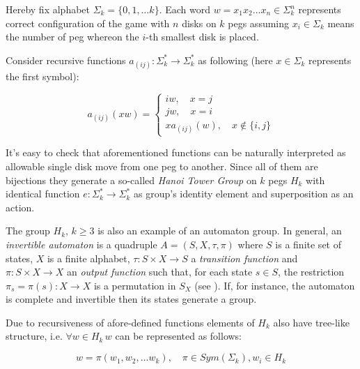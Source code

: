 \documentclass[a4paper,12pt]{amsart}
\begin{document}
Hereby fix alphabet $\Sigma_k = \{0, 1, \dots k\}$. Each word $w = x_1x_2\dots x_n \in \Sigma_k^n$ represents correct configuration of the game with $n$ disks on $k$ pegs assuming $x_i \in \Sigma_k$ means the number of peg whereon the $i$-th smallest disk is placed. 

Consider recursive functions $a_{(ij)} : \Sigma_k^* \rightarrow \Sigma_k^*$ as following (here $x \in \Sigma_k$ represents the first symbol): 

$$
a_{(ij)}(xw) = 
	\begin{cases}
	iw, \quad x = j \\
	jw, \quad x = i \\
	xa_{(ij)}(w), \quad x \notin \{i, j\}
	\end{cases}
$$	

It's easy to check that aforementioned functions can be naturally interpreted as allowable single disk move from one peg to another. Since all of them are bijections they generate a so-called \textit{Hanoi Tower Group} on $k$ pegs $H_{k}$ with identical function $e : \Sigma_k^* \rightarrow \Sigma_k^*$ as group's identity element and superposition as an action. \cite{Hanoi1}  

The group $H_k, \, k \ge 3$ is also an example of an automaton group. In general, an \textit{invertible automaton} is a quadruple $A = (S, X, \tau, \pi)$ where $S$ is a finite set of states, $X$ is a finite alphabet, $\tau: S\times X \rightarrow S$ a \textit{transition function} and $\pi : S \times X \rightarrow X$ an \textit{output function} such that, for each state $s \in S$, the restriction $\pi_s = \pi(s) : X \rightarrow X$ is a permutation in $S_X$ (see \cite{Auto}).  If, for instance, the automaton is complete and invertible then its states generate a group. 

Due to recursiveness of afore-defined functions elements of $H_k$ also have tree-like structure, i.e. $\forall w \in H_k \, w$ can be represented as follows: 

\begin{equation}
	\label{treelike}
	w = \pi (w_1, w_2, \dots w_k), \quad \pi \in Sym(\Sigma_k), w_i \in H_k
\end{equation}
\end{document}
